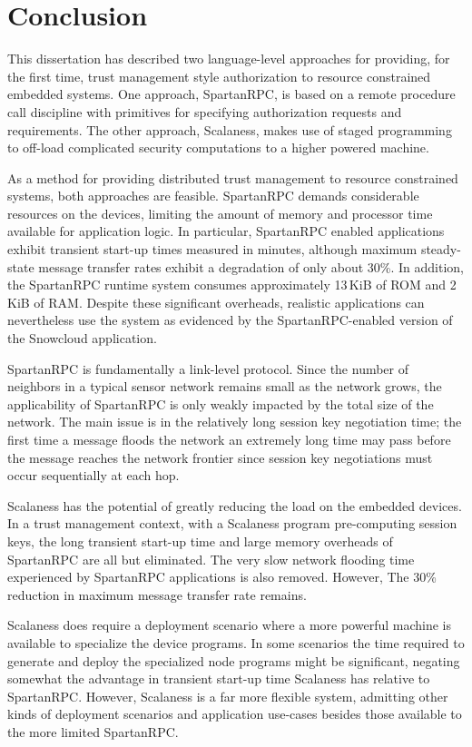 
\chapter{Conclusion}
\label{chapter-conclusion}

This dissertation has described two language-level approaches for providing, for the first time,
trust management style authorization to resource constrained embedded systems. One approach,
SpartanRPC, is based on a remote procedure call discipline with primitives for specifying
authorization requests and requirements. The other approach, Scalaness, makes use of staged
programming to off-load complicated security computations to a higher powered machine.

As a method for providing distributed trust management to resource constrained systems, both
approaches are feasible. SpartanRPC demands considerable resources on the devices, limiting the
amount of memory and processor time available for application logic. In particular, SpartanRPC
enabled applications exhibit transient start-up times measured in minutes, although maximum
steady-state message transfer rates exhibit a degradation of only about 30\%. In addition, the
SpartanRPC runtime system consumes approximately 13\,KiB of ROM and 2\,KiB of RAM. Despite these
significant overheads, realistic applications can nevertheless use the system as evidenced by
the SpartanRPC-enabled version of the Snowcloud application.

SpartanRPC is fundamentally a link-level protocol. Since the number of neighbors in a typical
sensor network remains small as the network grows, the applicability of SpartanRPC is only
weakly impacted by the total size of the network. The main issue is in the relatively long
session key negotiation time; the first time a message floods the network an extremely long time
may pass before the message reaches the network frontier since session key negotiations must
occur sequentially at each hop.

Scalaness has the potential of greatly reducing the load on the embedded devices. In a trust
management context, with a Scalaness program pre-computing session keys, the long transient
start-up time and large memory overheads of SpartanRPC are all but eliminated. The very slow
network flooding time experienced by SpartanRPC applications is also removed. However, The 30\%
reduction in maximum message transfer rate remains.

Scalaness does require a deployment scenario where a more powerful machine is available to
specialize the device programs. In some scenarios the time required to generate and deploy the
specialized node programs might be significant, negating somewhat the advantage in transient
start-up time Scalaness has relative to SpartanRPC. However, Scalaness is a far more flexible
system, admitting other kinds of deployment scenarios and application use-cases besides those
available to the more limited SpartanRPC.

